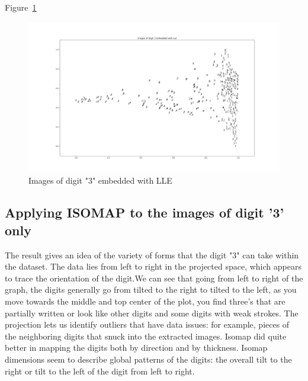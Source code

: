 Figure~\ref{fig:fig9} 
\begin{figure}[htb]
 \centering
\includegraphics[width=\textwidth]{assignment1/3-1-LLEembedding.png}
\caption{\label{fig:fig9}Images of digit "3" embedded with LLE}
\end{figure}



\clearpage{}
\subsection{Applying ISOMAP to the images of digit '3' only}

The result gives  an idea of the variety of forms that the digit "3" can take within the dataset. The data lies from left to right in  the projected space, which appears to trace the orientation of the digit.We can see that going from left to right of the graph, the digits generally go from tilted to the right to tilted to the left, as you move towards the middle and top center of the plot, you find three's that are partially written or look like other digits and some digits with weak strokes. The projection lets us identify outliers that have data issues: for example, pieces of the neighboring digits that snuck into the extracted images.
Isomap did quite better in mapping the digits both by direction and by thickness. 
Isomap dimensions seem to describe global patterns of the digits: the overall tilt to the right or tilt to the left of the digit from left to right.


